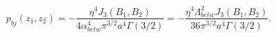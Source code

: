 \begin{equation}
 p_{bj}(z_{1},z_{2})=-\frac{\eta^{4}J_3(B_1,B_2)}{4\alpha_{betw}^{4}\pi
^{3/2}a^{4}\Gamma (3/2)}=-\frac{\eta^{4}\Lambda_{betw
}^{2}J_3(B_1,B_2)}{36\pi ^{3/2}a^{4}\Gamma (3/2)}.
 \end{equation}

